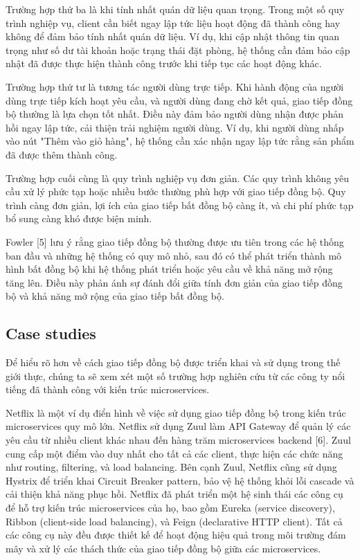 Trường hợp thứ ba là khi tính nhất quán dữ liệu quan trọng. Trong một số quy trình nghiệp vụ, client cần biết ngay lập tức liệu hoạt động đã thành công hay không để đảm bảo tính nhất quán dữ liệu. Ví dụ, khi cập nhật thông tin quan trọng như số dư tài khoản hoặc trạng thái đặt phòng, hệ thống cần đảm bảo cập nhật đã được thực hiện thành công trước khi tiếp tục các hoạt động khác.

Trường hợp thứ tư là tương tác người dùng trực tiếp. Khi hành động của người dùng trực tiếp kích hoạt yêu cầu, và người dùng đang chờ kết quả, giao tiếp đồng bộ thường là lựa chọn tốt nhất. Điều này đảm bảo người dùng nhận được phản hồi ngay lập tức, cải thiện trải nghiệm người dùng. Ví dụ, khi người dùng nhấp vào nút "Thêm vào giỏ hàng", hệ thống cần xác nhận ngay lập tức rằng sản phẩm đã được thêm thành công.

Trường hợp cuối cùng là quy trình nghiệp vụ đơn giản. Các quy trình không yêu cầu xử lý phức tạp hoặc nhiều bước thường phù hợp với giao tiếp đồng bộ. Quy trình càng đơn giản, lợi ích của giao tiếp bất đồng bộ càng ít, và chi phí phức tạp bổ sung càng khó được biện minh.

Fowler [5] lưu ý rằng giao tiếp đồng bộ thường được ưu tiên trong các hệ thống ban đầu và những hệ thống có quy mô nhỏ, sau đó có thể phát triển thành mô hình bất đồng bộ khi hệ thống phát triển hoặc yêu cầu về khả năng mở rộng tăng lên. Điều này phản ánh sự đánh đổi giữa tính đơn giản của giao tiếp đồng bộ và khả năng mở rộng của giao tiếp bất đồng bộ.

\subsection{Case studies}
Để hiểu rõ hơn về cách giao tiếp đồng bộ được triển khai và sử dụng trong thế giới thực, chúng ta sẽ xem xét một số trường hợp nghiên cứu từ các công ty nổi tiếng đã thành công với kiến trúc microservices.

Netflix là một ví dụ điển hình về việc sử dụng giao tiếp đồng bộ trong kiến trúc microservices quy mô lớn. Netflix sử dụng Zuul làm API Gateway để quản lý các yêu cầu từ nhiều client khác nhau đến hàng trăm microservices backend [6]. Zuul cung cấp một điểm vào duy nhất cho tất cả các client, thực hiện các chức năng như routing, filtering, và load balancing. Bên cạnh Zuul, Netflix cũng sử dụng Hystrix để triển khai Circuit Breaker pattern, bảo vệ hệ thống khỏi lỗi cascade và cải thiện khả năng phục hồi. Netflix đã phát triển một hệ sinh thái các công cụ để hỗ trợ kiến trúc microservices của họ, bao gồm Eureka (service discovery), Ribbon (client-side load balancing), và Feign (declarative HTTP client). Tất cả các công cụ này đều được thiết kế để hoạt động hiệu quả trong môi trường đám mây và xử lý các thách thức của giao tiếp đồng bộ giữa các microservices.

